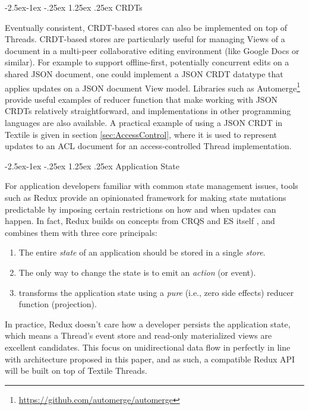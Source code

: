 \documentclass{textile}
\makeatletter
\renewcommand\paragraph{\@startsection{paragraph}{4}{\z@}%
            {-2.5ex\@plus -1ex \@minus -.25ex}%
            {1.25ex \@plus .25ex}%
            {\normalfont\normalsize\itshape}}
\makeatother
\begin{document}
\paragraph{CRDTs} \label{sec:TexCRDT}

Eventually consistent, CRDT-based stores can also be implemented on top of Threads. CRDT-based stores are particularly useful for managing Views of a document in a multi-peer collaborative editing environment (like Google Docs or similar). For example to support offline-first, potentially concurrent edits on a shared JSON document, one could implement a JSON CRDT datatype \cite{kleppmannConflictFreeReplicatedJSON2017} that applies updates on a JSON document View model. Libraries such as Automerge\footnote{\url{https://github.com/automerge/automerge}} provide useful examples of reducer function that make working with JSON CRDTs relatively straightforward, and implementations in other programming languages are also available. A practical example of using a JSON CRDT in Textile is given in section \ref{sec:AccessControl}, where it is used to represent updates to an ACL document for an access-controlled Thread implementation.

\paragraph{Application State}

For application developers familiar with common state management issues, tools such as Redux provide an opinionated framework for making state mutations predictable by imposing certain restrictions on how and when updates can happen. In fact, Redux builds on concepts from CRQS and ES itself \cite{reduxMotivation}, and combines them with three core principals: 

\begin{enumerate}
\item The entire \emph{state} of an application should be stored in a single \emph{store}.
\item The only way to change the state is to emit an \emph{action} (or event).
\item transforms the application state using a \emph{pure} (i.e., zero side effects) reducer function (projection).
\end{enumerate}

 In practice, Redux doesn't care how a developer persists the application state, which means a Thread's event store and read-only materialized views are excellent candidates. This focus on unidirectional data flow in perfectly in line with architecture proposed in this paper, and as such, a compatible Redux API will be built on top of Textile Threads.
\end{document}
